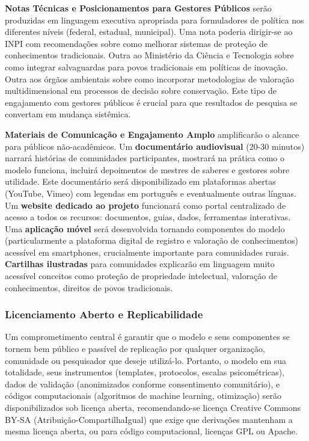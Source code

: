 \textbf{Notas Técnicas e Posicionamentos para Gestores Públicos} serão produzidas em linguagem executiva apropriada para formuladores de política nos diferentes níveis (federal, estadual, municipal). Uma nota poderia dirigir-se ao INPI com recomendações sobre como melhorar sistemas de proteção de conhecimentos tradicionais. Outra ao Ministério da Ciência e Tecnologia sobre como integrar salvaguardas para povos tradicionais em políticas de inovação. Outra aos órgãos ambientais sobre como incorporar metodologias de valoração multidimensional em processos de decisão sobre conservação. Este tipo de engajamento com gestores públicos é crucial para que resultados de pesquisa se convertam em mudança sistêmica.

\textbf{Materiais de Comunicação e Engajamento Amplo} amplificarão o alcance para públicos não-acadêmicos. Um \textbf{documentário audiovisual} (20-30 minutos) narrará histórias de comunidades participantes, mostrará na prática como o modelo funciona, incluirá depoimentos de mestres de saberes e gestores sobre utilidade. Este documentário será disponibilizado em plataformas abertas (YouTube, Vimeo) com legendas em português e eventualmente outras línguas. Um \textbf{website dedicado ao projeto} funcionará como portal centralizado de acesso a todos os recursos: documentos, guias, dados, ferramentas interativas. Uma \textbf{aplicação móvel} será desenvolvida tornando componentes do modelo (particularmente a plataforma digital de registro e valoração de conhecimentos) acessível em smartphones, crucialmente importante para comunidades rurais. \textbf{Cartilhas ilustradas} para comunidades explicarão em linguagem muito acessível conceitos como proteção de propriedade intelectual, valoração de conhecimentos, direitos de povos tradicionais.

\subsubsection{Licenciamento Aberto e Replicabilidade}

Um comprometimento central é garantir que o modelo e seus componentes se tornem bem público e passível de replicação por qualquer organização, comunidade ou pesquisador que deseje utilizá-lo. Portanto, o modelo em sua totalidade, seus instrumentos (templates, protocolos, escalas psicométricas), dados de validação (anonimizados conforme consentimento comunitário), e códigos computacionais (algoritmos de machine learning, otimização) serão disponibilizados sob licença aberta, recomendando-se licença Creative Commons BY-SA (Atribuição-CompartilhaIgual) que exige que derivações mantenham a mesma licença aberta, ou para código computacional, licenças GPL ou Apache.

